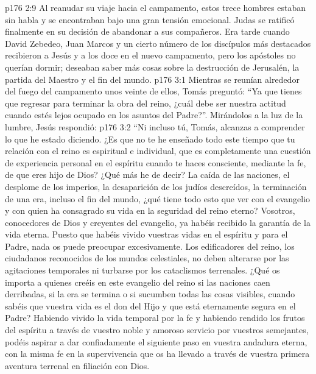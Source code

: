 \vs p176 2:9 Al reanudar su viaje hacia el campamento, estos trece hombres estaban sin habla y se encontraban bajo una gran tensión emocional. Judas se ratificó finalmente en su decisión de abandonar a sus compañeros. Era tarde cuando David Zebedeo, Juan Marcos y un cierto número de los discípulos más destacados recibieron a Jesús y a los doce en el nuevo campamento, pero los apóstoles no querían dormir; deseaban saber más cosas sobre la destrucción de Jerusalén, la partida del Maestro y el fin del mundo.
\vs p176 3:1 Mientras se reunían alrededor del fuego del campamento unos veinte de ellos, Tomás preguntó: “Ya que tienes que regresar para terminar la obra del reino, ¿cuál debe ser nuestra actitud cuando estés lejos ocupado en los asuntos del Padre?”. Mirándolos a la luz de la lumbre, Jesús respondió:
\vs p176 3:2 \pc “Ni incluso tú, Tomás, alcanzas a comprender lo que he estado diciendo. ¿Es que no te he enseñado todo este tiempo que tu relación con el reino es espiritual e individual, que es completamente una cuestión de experiencia personal en el espíritu cuando te haces consciente, mediante la fe, de que eres hijo de Dios? ¿Qué más he de decir? La caída de las naciones, el desplome de los imperios, la desaparición de los judíos descreídos, la terminación de una era, incluso el fin del mundo, ¿qué tiene todo esto que ver con el evangelio y con quien ha consagrado su vida en la seguridad del reino eterno? Vosotros, conocedores de Dios y creyentes del evangelio, ya habéis recibido la garantía de la vida eterna. Puesto que habéis vivido vuestras vidas en el espíritu y para el Padre, nada os puede preocupar excesivamente. Los edificadores del reino, los ciudadanos reconocidos de los mundos celestiales, no deben alterarse por las agitaciones temporales ni turbarse por los cataclismos terrenales. ¿Qué os importa a quienes creéis en este evangelio del reino si las naciones caen derribadas, si la era se termina o si sucumben todas las cosas visibles, cuando sabéis que vuestra vida es el don del Hijo y que está eternamente segura en el Padre? Habiendo vivido la vida temporal por la fe y habiendo rendido los frutos del espíritu a través de vuestro noble y amoroso servicio por vuestros semejantes, podéis aspirar a dar confiadamente el siguiente paso en vuestra andadura eterna, con la misma fe en la supervivencia que os ha llevado a través de vuestra primera aventura terrenal en filiación con Dios.
